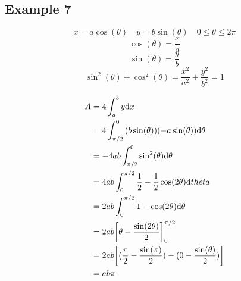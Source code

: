 \documentclass[letterpaper, 12pt]{math}
\begin{document}
\subsection*{Example 7}
\[ x = a\cos(\theta) \quad y = b\sin(\theta) \quad 0 \leq \theta \leq 2\pi \]
\[ \cos(\theta) = \frac{x}{a} \]
\[ \sin(\theta) = \frac{y}{b} \]
\[ \sin^{2}(\theta)+\cos^{2}(\theta) =
   \frac{x^{2}}{a^{2}}+\frac{y^{2}}{b^{2}} = 1 \]
\begin{center}
\end{center}
\begin{align*}
  A &= 4\int_{a}^{b}{y\mathrm{d}{x}} \\
  &= 4\int_{\pi/2}^{0}{(b\sin(\theta))(-a\sin(\theta))\mathrm{d}{\theta}} \\
  &= -4ab\int_{\pi/2}^{0}{\sin^{2}(\theta)\mathrm{d}{\theta}} \\
  &= 4ab\int_{0}^{\pi/2}{\frac{1}{2}-\frac{1}{2}\cos(2\theta)\mathrm{d}{theta}} \\
  &= 2ab\int_{0}^{\pi/2}{1-\cos(2\theta)\mathrm{d}{\theta}} \\
  &= 2ab\bigg[\theta-\frac{\sin(2\theta)}{2}\bigg]_{0}^{\pi/2} \\
  &= 2ab\bigg[(\frac{\pi}{2}-\frac{\sin(\pi)}{2})-
    (0-\frac{\sin(\theta)}{2})\bigg] \\
  &= ab\pi
\end{align*}
\end{document}
